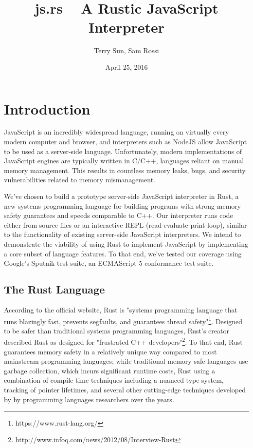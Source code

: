\documentclass{article}
\title{js.rs -- A Rustic JavaScript Interpreter}
\date{April 25, 2016}
\author{Terry Sun, Sam Rossi}
\begin{document}
\maketitle

\section*{Introduction}

JavaScript is an incredibly widespread language, running on virtually every
modern computer and browser, and interpreters such as NodeJS allow JavaScript to
be used as a server-side language. Unfortunately, modern implementations of
JavaScript engines are typically written in C/C++, languages reliant on manual
memory management. This results in countless memory leaks, bugs, and security
vulnerabilities related to memory mismanagement. \newline

We’ve chosen to build a prototype server-side JavaScript interpreter in Rust, a
new systems programming language for building programs with strong memory safety
guarantees and speeds comparable to C++. Our interpreter runs code either from
source files or an interactive REPL (read-evaluate-print-loop), similar to the
functionality of existing server-side JavaScript interpreters. We intend to
demonstrate the viability of using Rust to implement JavaScript by implementing
a core subset of language features. To that end, we’ve tested our coverage using
Google’s Sputnik test suite, an ECMAScript 5 conformance test suite.

\subsection*{The Rust Language}

According to the official website, Rust is "systems programming language that
runs blazingly fast, prevents segfaults, and guarantees thread
safety"\footnote{https://www.rust-lang.org/}. Designed to be safer than
traditional systems programming languages, Rust's creator described Rust as
designed for "frustrated C++
developers"\footnote{http://www.infoq.com/news/2012/08/Interview-Rust}. To that
end, Rust guarantees memory safety in a relatively unique way compared to most
mainstream programming languages; while traditional memory-safe languages use
garbage collection, which incurs significant runtime costs, Rust using a
combination of compile-time techniques including a nuanced type system, tracking
of pointer lifetimes, and several other cutting-edge techniques developed by
by programming languages researchers over the years.
\end{document}
